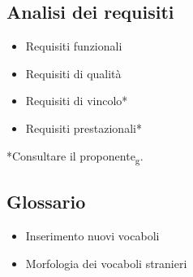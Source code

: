         \subsection{Analisi dei requisiti}
            \begin{itemize}
                \item Requisiti funzionali
                \item Requisiti di qualità
                \item Requisiti di vincolo*
                \item Requisiti prestazionali* 
            \end{itemize}   
            \begin{small}*Consultare il proponente\textsubscript{g}.
            \end{small} 
        \subsection{Glossario}
            \begin{itemize}
                \item Inserimento nuovi vocaboli
                \item Morfologia dei vocaboli stranieri
            \end{itemize}
        